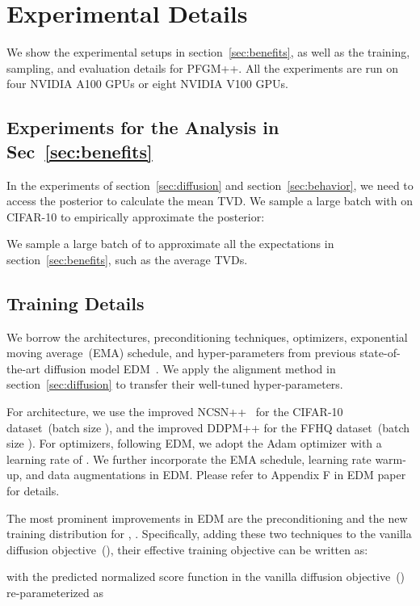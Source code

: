 \section{Experimental Details}
\label{app:exp}
We show the experimental setups in section~\ref{sec:benefits}, as well as the training, sampling, and evaluation details for PFGM++. All the experiments are run on four NVIDIA A100 GPUs or eight NVIDIA V100 GPUs.


\subsection{Experiments for the Analysis in Sec~\ref{sec:benefits}}
\label{app:be-exp}
In the experiments of section~\ref{sec:diffusion} and section~\ref{sec:behavior}, we need to access the posterior  to calculate the mean TVD. We sample a large batch  with  on CIFAR-10 to empirically approximate the posterior:


We sample a large batch of  to approximate all the expectations in section~\ref{sec:benefits}, such as the average TVDs.
\subsection{Training Details}

We borrow the architectures, preconditioning techniques, optimizers, exponential moving average~(EMA) schedule, and hyper-parameters from previous state-of-the-art diffusion model EDM~\cite{Karras2022ElucidatingTD}. We apply the alignment method in section~\ref{sec:diffusion} to transfer their well-tuned hyper-parameters. 

For architecture, we use the improved NCSN++~\cite{Karras2022ElucidatingTD} for the CIFAR-10 dataset~(batch size ), and the improved DDPM++ for the FFHQ dataset~(batch size ). For optimizers, following EDM, we adopt the Adam optimizer with a learning rate of . We further incorporate the EMA schedule, learning rate warm-up, and data augmentations in EDM. Please refer to Appendix F in EDM paper~\cite{Karras2022ElucidatingTD} for details.

The most prominent improvements in EDM are the preconditioning and the new training distribution for , \ie . Specifically, adding these two techniques to the vanilla diffusion objective~(), their effective training objective can be written as:

with the predicted normalized score function in the vanilla diffusion objective~() re-parameterized as 

